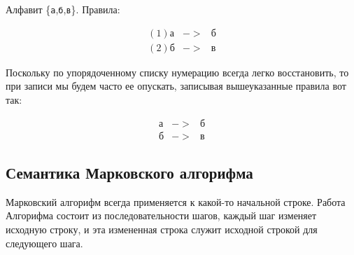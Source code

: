 \documentclass[12pt,a4paper,oneside]{article}
\newcommand{\s}[1]{\texttt{#1}}
\begin{document}
\begin{example} Алфавит \{\s{а},\s{б},\s{в}\}. Правила:
\begin{bnf}
  \begin{eqnarray*}
   (1) \s{а}&->&\s{б}\\
   (2) \s{б}&->&\s{в}
\end{eqnarray*}\end{bnf}
\end{example}

Поскольку по упорядоченному списку нумерацию всегда легко 
восстановить, то при записи мы будем часто ее опускать, записывая
вышеуказанные правила вот так:

\begin{bnf}\begin{eqnarray*}
   \s{а}&->&\s{б}\\
   \s{б}&->&\s{в}
\end{eqnarray*}\end{bnf}  

\subsection{Семантика Марковского алгорифма}

Марковский алгорифм всегда применяется к какой-то начальной строке. 
Работа Алгорифма состоит из последовательности шагов, каждый шаг 
изменяет исходную строку, и эта измененная строка служит исходной строкой 
для следующего шага.
\end{document}
